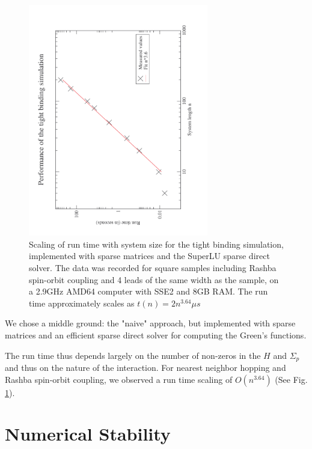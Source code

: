 \begin{figure}[htb]
    \begin{center}
    \includegraphics[angle=270,width=0.7\textwidth]{scaling.pdf}
    \end{center}
    \caption{Scaling of run time with system size for the tight binding
        simulation, implemented with sparse matrices and the SuperLU sparse
        direct solver. The data was recorded for square samples including
        Rashba spin-orbit coupling and 4 leads of the same width as the
        sample, on a 2.9GHz AMD64 computer with SSE2 and 8GB RAM.
        The run time approximately scales as $t(n) = 2
        n^{3.64}\mu s$}
        \label{fig:scaling}
\end{figure}

We chose a middle ground: the "naive" approach, but implemented with sparse
matrices and an efficient sparse direct solver \cite{superlu99} for
computing the Green's functions.

The run time thus depends largely on the number of non-zeros in the $H$ and
$\Sigma_p$ and thus on the nature of the interaction. For nearest neighbor
hopping and Rashba spin-orbit coupling, we observed a run time scaling of
$O(n^{3.64})$ (See Fig. \ref{fig:scaling}).

\section{Numerical Stability}

